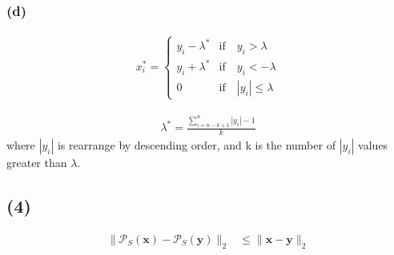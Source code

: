 \documentclass[12pt]{article}
\begin{document}
\subsubsection{(d)}

\begin{align*}
    x_i^* = \begin{cases}
        y_i - \lambda^* &\text{if}\quad y_i > \lambda \\
        y_i + \lambda^* &\text{if}\quad y_i < -\lambda \\
        0             &\text{if}\quad |y_i| \leq \lambda
    \end{cases}
\end{align*}

\begin{align*}
    \lambda^* = \frac{\sum_{i=n-k+1}^{n}|y_{i}| - 1}{k}
\end{align*}
where \(|y_i|\) is rearrange by descending order, and k is the number of \(|y_i|\) values greater than \(\lambda\).


\subsection{(4)}
\begin{align*}
    \|\mathcal{P}_S(\bm{x}) - \mathcal{P}_S(\bm{y}) \|_2 &\leq \|\bm{x} - \bm{y}\|_2 \\
\end{align*}
\end{document}

